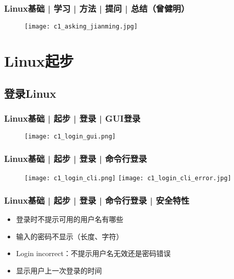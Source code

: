 \begin{frame}
  \frametitle{Linux基础 | 学习 | 方法 | 提问 | \alert{总结}（曾健明）}
  \begin{figure}
    \centering
    \texttt{[image: c1\_asking\_jianming.jpg]}
  \end{figure}
\end{frame}

\section{Linux起步}
\subsection{登录Linux}
\begin{frame}
  \frametitle{Linux基础 | 起步 | 登录 | GUI登录}
  \begin{figure}
    \centering
    \texttt{[image: c1\_login\_gui.png]}
  \end{figure}
\end{frame}

\begin{frame}
  \frametitle{Linux基础 | 起步 | 登录 | 命令行登录}
  \begin{figure}
    \centering
    \texttt{[image: c1\_login\_cli.png]}
    \vspace{0.1cm}
    \texttt{[image: c1\_login\_cli\_error.jpg]}
  \end{figure}
\end{frame}

\begin{frame}
  \frametitle{Linux基础 | 起步 | 登录 | 命令行登录 | 安全特性}
  \begin{itemize}[<+->]
    \item 登录时不提示可用的用户名有哪些
    \item 输入的密码不显示（长度、字符）
    \item Login incorrect：不提示用户名无效还是密码错误
    \item 显示用户上一次登录的时间
  \end{itemize}
\end{frame}

